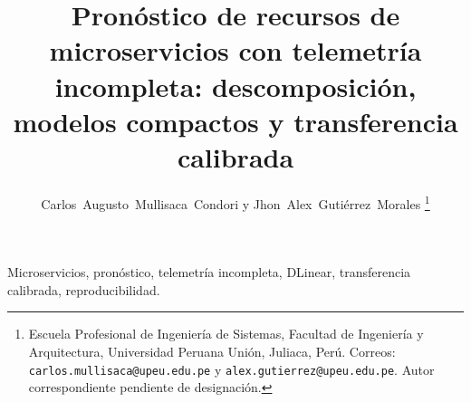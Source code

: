 \documentclass[10pt,journal,letterpaper]{IEEEtran}
\title{Pronóstico de recursos de microservicios con telemetría incompleta: descomposición, modelos compactos y transferencia calibrada}
\author{Carlos~Augusto~Mullisaca~Condori y Jhon~Alex~Gutiérrez~Morales%
  \thanks{Escuela Profesional de Ingeniería de Sistemas, Facultad de Ingeniería y Arquitectura, Universidad Peruana Unión, Juliaca, Perú. Correos: \mbox{\nolinkurl{carlos.mullisaca@upeu.edu.pe}} y \mbox{\nolinkurl{alex.gutierrez@upeu.edu.pe}}. Autor correspondiente pendiente de designación.}}
\begin{document}
\maketitle
\begin{abstract}

\end{abstract}
\begin{IEEEkeywords}
Microservicios, pronóstico, telemetría incompleta, DLinear, transferencia calibrada, reproducibilidad.
\end{IEEEkeywords}










\FloatBarrier

\FloatBarrier


\end{document}
